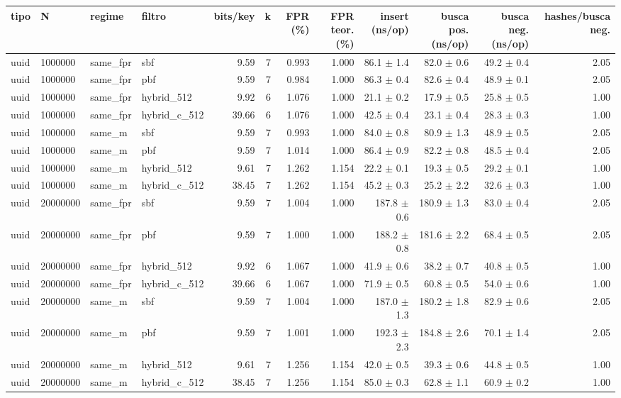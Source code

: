 \begin{tabular}{llllrrrrrrrr}
\toprule
tipo & N & regime & filtro & bits/key & k & FPR (\%) & FPR teor. (\%) & insert (ns/op) & busca pos. (ns/op) & busca neg. (ns/op) & hashes/busca neg. \\
\midrule
uuid & 1000000 & same\_fpr & sbf & 9.59 & 7 & 0.993 & 1.000 & 86.1 $\pm$ 1.4 & 82.0 $\pm$ 0.6 & 49.2 $\pm$ 0.4 & 2.05 \\
uuid & 1000000 & same\_fpr & pbf & 9.59 & 7 & 0.984 & 1.000 & 86.3 $\pm$ 0.4 & 82.6 $\pm$ 0.4 & 48.9 $\pm$ 0.1 & 2.05 \\
uuid & 1000000 & same\_fpr & hybrid\_512 & 9.92 & 6 & 1.076 & 1.000 & 21.1 $\pm$ 0.2 & 17.9 $\pm$ 0.5 & 25.8 $\pm$ 0.5 & 1.00 \\
uuid & 1000000 & same\_fpr & hybrid\_c\_512 & 39.66 & 6 & 1.076 & 1.000 & 42.5 $\pm$ 0.4 & 23.1 $\pm$ 0.4 & 28.3 $\pm$ 0.3 & 1.00 \\
uuid & 1000000 & same\_m & sbf & 9.59 & 7 & 0.993 & 1.000 & 84.0 $\pm$ 0.8 & 80.9 $\pm$ 1.3 & 48.9 $\pm$ 0.5 & 2.05 \\
uuid & 1000000 & same\_m & pbf & 9.59 & 7 & 1.014 & 1.000 & 86.4 $\pm$ 0.9 & 82.2 $\pm$ 0.8 & 48.5 $\pm$ 0.4 & 2.05 \\
uuid & 1000000 & same\_m & hybrid\_512 & 9.61 & 7 & 1.262 & 1.154 & 22.2 $\pm$ 0.1 & 19.3 $\pm$ 0.5 & 29.2 $\pm$ 0.1 & 1.00 \\
uuid & 1000000 & same\_m & hybrid\_c\_512 & 38.45 & 7 & 1.262 & 1.154 & 45.2 $\pm$ 0.3 & 25.2 $\pm$ 2.2 & 32.6 $\pm$ 0.3 & 1.00 \\
uuid & 20000000 & same\_fpr & sbf & 9.59 & 7 & 1.004 & 1.000 & 187.8 $\pm$ 0.6 & 180.9 $\pm$ 1.3 & 83.0 $\pm$ 0.4 & 2.05 \\
uuid & 20000000 & same\_fpr & pbf & 9.59 & 7 & 1.000 & 1.000 & 188.2 $\pm$ 0.8 & 181.6 $\pm$ 2.2 & 68.4 $\pm$ 0.5 & 2.05 \\
uuid & 20000000 & same\_fpr & hybrid\_512 & 9.92 & 6 & 1.067 & 1.000 & 41.9 $\pm$ 0.6 & 38.2 $\pm$ 0.7 & 40.8 $\pm$ 0.5 & 1.00 \\
uuid & 20000000 & same\_fpr & hybrid\_c\_512 & 39.66 & 6 & 1.067 & 1.000 & 71.9 $\pm$ 0.5 & 60.8 $\pm$ 0.5 & 54.0 $\pm$ 0.6 & 1.00 \\
uuid & 20000000 & same\_m & sbf & 9.59 & 7 & 1.004 & 1.000 & 187.0 $\pm$ 1.3 & 180.2 $\pm$ 1.8 & 82.9 $\pm$ 0.6 & 2.05 \\
uuid & 20000000 & same\_m & pbf & 9.59 & 7 & 1.001 & 1.000 & 192.3 $\pm$ 2.3 & 184.8 $\pm$ 2.6 & 70.1 $\pm$ 1.4 & 2.05 \\
uuid & 20000000 & same\_m & hybrid\_512 & 9.61 & 7 & 1.256 & 1.154 & 42.0 $\pm$ 0.5 & 39.3 $\pm$ 0.6 & 44.8 $\pm$ 0.5 & 1.00 \\
uuid & 20000000 & same\_m & hybrid\_c\_512 & 38.45 & 7 & 1.256 & 1.154 & 85.0 $\pm$ 0.3 & 62.8 $\pm$ 1.1 & 60.9 $\pm$ 0.2 & 1.00 \\
\bottomrule
\end{tabular}
